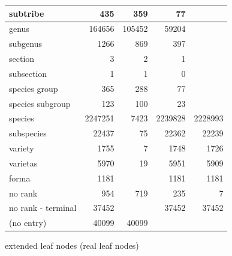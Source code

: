 \begin{center}
\begin{tabular}{ |l|r||r|r|r| }
        subtribe & 435 & 359 & 77 & \\ \hline
        \setrow{\bfseries}genus & 164656 & 105452 & 59204 & \\
        subgenus & 1266 & 869 & 397 & \\
        section & 3 & 2 & 1 & \\
        subsection & 1 & 1 & 0 & \\
        species group & 365 & 288 & 77 & \\
        species subgroup & 123 & 100 & 23 & \\ \hline
        \setrow{\bfseries}species & 2247251 & 7423 & 2239828 & 2228993 \\
        subspecies & 22437 & 75 & 22362 & 22239 \\
        variety & 1755 & 7 & 1748 & 1726 \\
        varietas & 5970 & 19 & 5951 & 5909 \\
        forma & 1181 & & 1181 & 1181 \\
        \hline \hline
        no rank & 954 & 719 & 235 & 7 \\
        no rank - terminal & 37452 & & 37452 & 37452 \\
        (no entry) & 40099 & 40099 & & \\
        \hline  
      \end{tabular}
    \end{center}
    extended leaf nodes (real leaf nodes)


